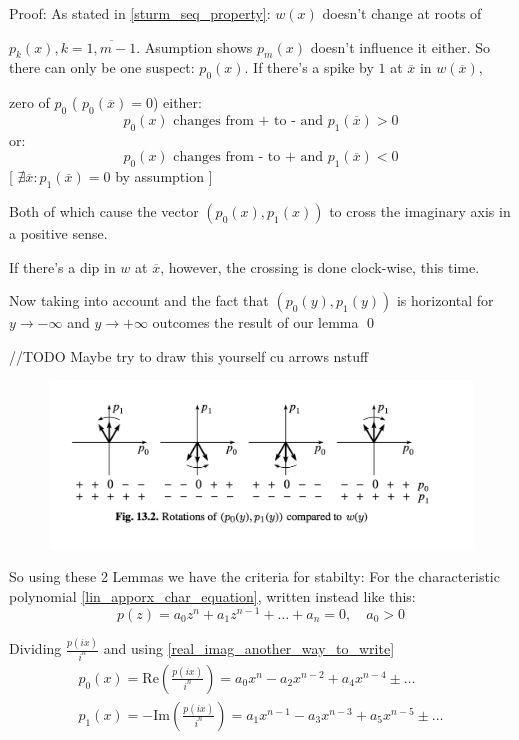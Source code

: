 Proof: As stated in \ref{sturm_seq_property}: $w(x)$ doesn't change at roots of

$p_k(x), k = \overline{1,m-1}$. Asumption  shows $p_m(x)$
doesn't influence it either. So there can only be one suspect:
$p_0(x)$. If there's a spike by $1$ at $\overline{x}$ in $w(\overline{x})$,

zero of $p_0$
(   $p_0(\overline{x}) =0 $) either:
\[
p_0(x) \text{ changes from + to - and   } p_1(\overline{x}) > 0
\]
or:
\[
p_0(x) \text{ changes from - to + and  } p_1(\overline{x}) < 0
\]
[   $\nexists \overline{x}: p_1(\overline{x}) = 0$ by assumption   ]

Both of which cause the vector $(p_0(x), p_1(x))$ to cross the
imaginary axis in a positive sense.

If there's a dip in $w$ at $\overline{x}$, however, the crossing is
done clock-wise, this time.

Now taking  into account and the fact that $(p_0(y), p_1(y))$
is horizontal for $y \rightarrow  - \infty$ and $y \rightarrow +
\infty  $ outcomes the result of our lemma
\qed

\hfill\break
//TODO Maybe try to draw this yourself cu arrows nstuff
\hfill\break

\begin{figure}
\includegraphics[width=13cm]{math_pics/sageti-cumse-invart.png}
\centering
\end{figure}

So using these 2 Lemmas we have the criteria for stabilty:
For the characteristic polynomial \ref{lin_apporx_char_equation},
written instead like this:
\[
p(z)=a_0 z^n + a_1z^{n-1} + \dots + a_n = 0, \quad a_0 > 0
\]

Dividing $\frac{p(i x)}{i^n}$ and using \ref{real_imag_another_way_to_write}
\begin{gather}
p_0(x)= \text{Re}(\frac{p(i x)}{i^n}) = a_0 x^{n} -a_2 x^{n-2} + a_4
x^{n-4} \pm \dots \\
p_1(x)= -\text{Im} (\frac{p(i x)}{i^n}) = a_1 x^{n-1} -a_3 x^{n-3} +
a_5 x^{n-5} \pm \dots
\end{gather}

